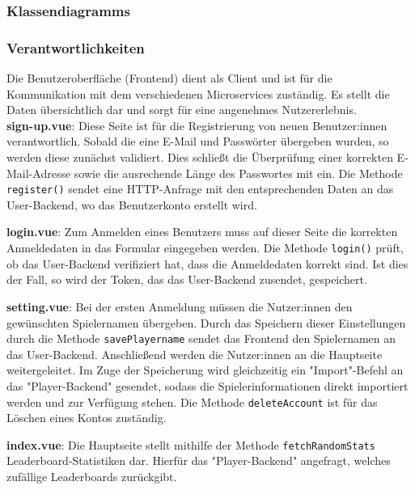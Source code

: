 \subsubsection{Klassendiagramms}


\subsubsection{Verantwortlichkeiten}

Die Benutzeroberfläche (Frontend) dient als Client und ist für die Kommunikation mit dem verschiedenen Microservices zuständig. Es stellt die Daten übersichtlich dar und sorgt für eine
angenehmes Nutzererlebnis. \\

\textbf{sign-up.vue}: Diese Seite ist für die Registrierung von neuen Benutzer:innen verantwortlich. Sobald die eine E-Mail und Passwörter übergeben wurden, so werden diese zunächst
validiert. Dies schließt die Überprüfung einer korrekten E-Mail-Adresse sowie die ausrechende Länge des Passwortes mit ein. Die Methode \verb|register()| sendet eine HTTP-Anfrage mit den 
entsprechenden Daten an das User-Backend, wo das Benutzerkonto erstellt wird.
\newline

\textbf{login.vue}: Zum Anmelden eines Benutzers muss auf dieser Seite die korrekten Anmeldedaten in das Formular eingegeben werden. Die Methode \verb|login()| prüft, ob das User-Backend
verifiziert hat, dass die Anmeldedaten korrekt sind. Ist dies der Fall, so wird der Token, das das User-Backend zusendet, gespeichert. 
\newline

\textbf{setting.vue}: Bei der ersten Anmeldung müssen die Nutzer:innen den gewünschten Spielernamen übergeben. Durch das Speichern dieser Einstellungen durch die Methode \verb|savePlayername|
sendet das Frontend den Spielernamen an das User-Backend. Anschließend werden die Nutzer:innen an die Hauptseite weitergeleitet. Im Zuge der Speicherung wird gleichzeitig ein "Import"-Befehl
an das "Player-Backend" gesendet, sodass die Spielerinformationen direkt importiert werden und zur Verfügung stehen. Die Methode \verb|deleteAccount| ist für das Löschen eines Kontos zuständig.
\newline

\textbf{index.vue}: Die Hauptseite stellt mithilfe der Methode \verb|fetchRandomStats| Leaderboard-Statistiken dar. Hierfür das "Player-Backend" angefragt, welches zufällige 
Leaderboards zurückgibt.
\newline

